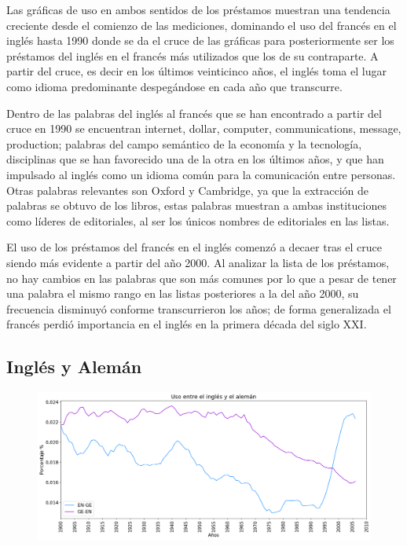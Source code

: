 Las gráficas de uso en ambos sentidos de los préstamos muestran una tendencia creciente desde el comienzo de las mediciones,  dominando el uso del francés en el inglés hasta 1990 donde se da el cruce de las gráficas para posteriormente ser los préstamos del inglés en el francés más utilizados que los de su contraparte.  A partir del cruce, es decir en los últimos veinticinco años, el inglés toma el lugar como idioma predominante despegándose en cada año que transcurre. 

Dentro de las palabras del inglés al francés que se han encontrado a partir del cruce en 1990 se encuentran internet, dollar, computer, communications, message, production;  palabras del campo semántico de la economía y la tecnología, disciplinas que se han favorecido una de la otra en los últimos años, y que han impulsado al inglés como un idioma común para la comunicación entre personas.  Otras palabras relevantes son Oxford y Cambridge,  ya que la extracción de palabras se obtuvo de los libros,  estas palabras muestran a ambas instituciones como líderes de editoriales, al ser los únicos nombres de editoriales en las listas.                         

El uso de los préstamos del francés en el inglés comenzó  a decaer tras el cruce siendo más evidente a partir del año 2000. Al analizar la lista de los préstamos, no hay cambios en las palabras que son más comunes por lo que a pesar de tener una palabra el mismo rango en las listas posteriores a la del año 2000,  su frecuencia disminuyó conforme transcurrieron los años; de forma generalizada el francés perdió importancia en el inglés en la primera década del siglo XXI.


\newpage
\subsection{Inglés y Alemán}

\begin{figure}[h!]
	\centering
	\includegraphics[scale=.38]{Cap_4/SF_2_S2_EN.png}
	\label{SF_EG}
	\caption{}
\end{figure}

